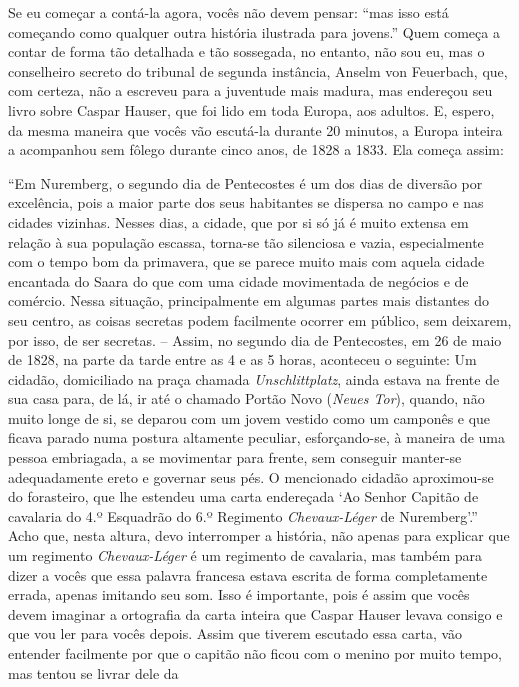 Se eu começar a contá-la agora, vocês não devem pensar: ``mas isso está
começando como qualquer outra história ilustrada para jovens.'' Quem
começa a contar de forma tão detalhada e tão sossegada, no entanto, não
sou eu, mas o conselheiro secreto do tribunal de segunda instância,
Anselm von Feuerbach, que, com certeza, não a escreveu para a juventude
mais madura, mas endereçou seu livro sobre Caspar Hauser, que
foi lido em toda Europa, aos adultos. E, espero, da mesma maneira que vocês vão
escutá-la durante 20 minutos, a Europa inteira a acompanhou sem fôlego
durante cinco anos, de 1828 a 1833. Ela começa assim:

``Em Nuremberg, o segundo dia de Pentecostes é um dos dias de diversão
por excelência, pois a maior parte dos seus habitantes se dispersa no
campo e nas cidades vizinhas. Nesses dias, a cidade, que por si só já é
muito extensa em relação à sua população escassa, torna-se tão
silenciosa e vazia, especialmente com o tempo bom da primavera, que se
parece muito mais com aquela cidade encantada do Saara do que com uma
cidade movimentada de negócios e de comércio. Nessa situação,
principalmente em algumas partes mais distantes do seu centro, as coisas
secretas podem facilmente ocorrer em público, sem deixarem, por isso, de
ser secretas. -- Assim, no segundo dia de Pentecostes, em 26 de maio de
1828, na parte da tarde entre as 4 e as 5 horas, aconteceu o seguinte:
Um cidadão, domiciliado na praça chamada \emph{Unschlittplatz}, ainda
estava na frente de sua casa para, de lá, ir até o chamado Portão Novo
(\emph{Neues Tor}), quando, não muito longe de si, se deparou com um
jovem vestido como um camponês e que ficava parado numa postura
altamente peculiar, esforçando-se, à maneira de uma pessoa embriagada, a
se movimentar para frente, sem conseguir manter-se adequadamente ereto e
governar seus pés. O mencionado cidadão aproximou-se do forasteiro, que
lhe estendeu uma carta endereçada `Ao Senhor Capitão de cavalaria do 4.º
Esquadrão do 6.º Regimento \emph{Chevaux-Léger} de Nuremberg'.'' Acho
que, nesta altura, devo interromper a história, não apenas para explicar
que um regimento \emph{Chevaux-Léger} é um regimento de cavalaria, mas
também para dizer a vocês que essa palavra francesa estava escrita de
forma completamente errada, apenas imitando seu som. Isso é importante,
pois é assim que vocês devem imaginar a ortografia da carta inteira que
Caspar Hauser levava consigo e que vou ler para vocês depois. Assim que
tiverem escutado essa carta, vão entender facilmente por que o capitão
não ficou com o menino por muito tempo, mas tentou se livrar dele da
